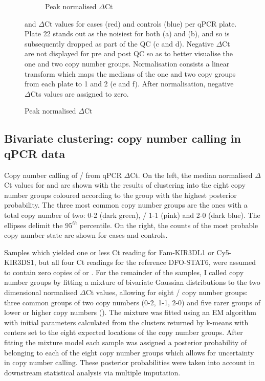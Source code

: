 \begin{figure}[!h]
\begin{subfigure}[b]{.4\textwidth}
    \caption{Peak normalised  $\Delta$Ct}
    \label{Figure-S1:f}
    \end{subfigure}
    {  and  $\Delta$Ct values for cases (red) and controls (blue) per qPCR plate.  }
    {
      Plate 22 stands out as the noisiest for both  (a) and  (b), and so is subsequently dropped as part of the QC (c and d).
      Negative $\Delta$Ct are not displayed for pre and post QC so as to better visualise the one and two copy number groups.
      Normalisation consists a linear transform which maps the medians of the one and two copy groups from each plate to 1 and 2 (e and f).
      After normalisation, negative $\Delta$Cts values are assigned to zero.
    }
\end{figure}

\subsection{Bivariate clustering: copy number calling in qPCR data}


{Copy number calling of / from qPCR $\Delta$Ct.}
{ On the left, the median normalised $\Delta$Ct values for  and
 are shown with the results of clustering into the eight
copy number groups coloured according to the group with the
highest posterior probability.  The three most common copy number groups are the
ones with a total copy number of two:  0-2 (dark green),
/ 1-1 (pink) and  2-0 (dark
blue).  The ellipses delimit the $95^{th}$ percentile.  On the right, the
counts of the most probable copy number state are shown for cases and
controls.}

Samples which yielded one or less Ct reading for Fam-KIR3DL1 or
Cy5-KIR3DS1, but all four Ct readings for the reference DFO-STAT6,
were assumed to contain zero copies of  or
.  For the remainder of the samples, I called copy number groups
by fitting a mixture of bivariate Gaussian distributions to the two
dimensional normalised $\Delta$Ct values, allowing for eight
/ copy number groups: three common groups of two copy
numbers (0-2, 1-1, 2-0) and five
rarer groups of lower or higher copy numbers
().  The mixture was fitted using
an \gls{EM} algorithm \citep{Young:2009ty} with initial parameters
calculated from the clusters returned by k-means with centers set to
the eight expected locations of the copy number groups.
After fitting the mixture model each sample was assigned a posterior
probability of belonging to each of the eight copy number groups which
allows for uncertainty in copy number calling.  These posterior
probabilities were taken into account in downstream statistical
analysis via multiple imputation.

